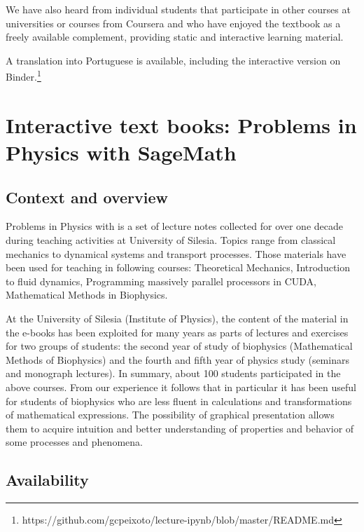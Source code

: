 \documentclass{deliverablereport}
\begin{document}
We have also heard from individual students that participate in other
courses at universities or courses from Coursera and who have enjoyed
the textbook as a freely available complement, providing static and
interactive learning material.

A translation into Portuguese is available, including the interactive
version on Binder.\footnote{https://github.com/gcpeixoto/lecture-ipynb/blob/master/README.md}
\pagebreak


\section{Interactive text books: Problems in Physics with SageMath}
\label{seq:problems-in-physics}


\subsection{Context and overview}

Problems in Physics with \Sage is a set of lecture notes collected for
over one decade during teaching activities at University of
Silesia. Topics range from classical mechanics to dynamical systems
and transport processes. Those materials have been used for teaching
in following courses: Theoretical Mechanics, Introduction to fluid
dynamics, Programming massively parallel processors in CUDA,
Mathematical Methods in Biophysics.


At the University of Silesia (Institute of Physics), the content of
the material in the e-books has been exploited for many years as parts
of lectures and exercises for two groups of students: the second year
of study of biophysics (Mathematical Methods of Biophysics) and the
fourth and fifth year of physics study (seminars and monograph
lectures). In summary, about 100 students participated in the above
courses. From our experience it follows that in particular it has been
useful for students of biophysics who are less fluent in calculations
and transformations of mathematical expressions. The possibility of
graphical presentation allows them to acquire intuition and better
understanding of properties and behavior of some processes and
phenomena.

\subsection{Availability}
\end{document}
